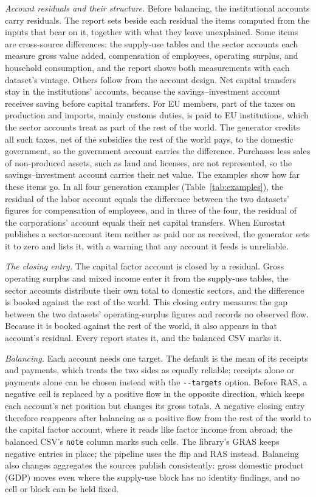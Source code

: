 \documentclass[11pt,a4paper]{article}
\begin{document}
\emph{Account residuals and their structure.} Before balancing, the
institutional accounts carry residuals. The report sets beside each
residual the items computed from the inputs that bear on it, together with
what they leave unexplained. Some items are cross-source differences: the
supply-use tables and the sector accounts each measure gross value added,
compensation of employees, operating surplus, and household consumption,
and the report shows both measurements with each dataset's vintage. Others
follow from the account design. Net capital transfers stay in the
institutions' accounts, because the savings--investment account receives
saving before capital transfers. For EU members, part of the taxes on
production and imports, mainly customs duties, is paid to EU institutions,
which the sector accounts treat as part of the rest of the world. The
generator credits all such taxes, net of the subsidies the rest of the
world pays, to the domestic government, so the government account carries
the difference. Purchases less sales of non-produced assets, such as land
and licenses, are not represented, so the savings--investment account
carries their net value. The examples show how far these items go. In
all four generation examples (Table~\ref{tab:examples}), the
residual of the labor account equals the difference between the two
datasets' figures for compensation of employees, and in three of the four,
the residual of the corporations' account equals their net capital
transfers. When Eurostat publishes a sector-account item neither as paid
nor as received, the generator sets it to zero and lists it, with a
warning that any account it feeds is unreliable.

\emph{The closing entry.} The capital factor account is closed by a
residual. Gross operating surplus and mixed income enter it from the
supply-use tables, the sector accounts distribute their own total to
domestic sectors, and the difference is booked against the rest of the
world. This closing entry measures the gap between the two datasets'
operating-surplus figures and records no observed flow. Because it is booked
against the rest of the world, it also appears in that account's
residual. Every report states it, and the balanced CSV marks it.

\emph{Balancing.} Each account needs one target. The default is the mean
of its receipts and payments, which treats the two sides as equally
reliable; receipts alone or payments alone can be chosen instead with the
\texttt{-{}-targets} option. Before RAS, a negative cell is replaced by a positive
flow in the opposite direction, which keeps each account's net position but
changes its gross totals. A negative closing entry therefore reappears
after balancing as a positive flow from the rest of the world to the
capital factor account, where it reads like factor income from abroad; the
balanced CSV's \texttt{note} column marks such cells. The library's GRAS
keeps negative entries in place; the pipeline uses the flip and RAS
instead. Balancing also changes aggregates the sources publish consistently:
gross domestic product (GDP) moves even where the supply-use block has no
identity findings, and no cell or block can be held fixed.
\end{document}
